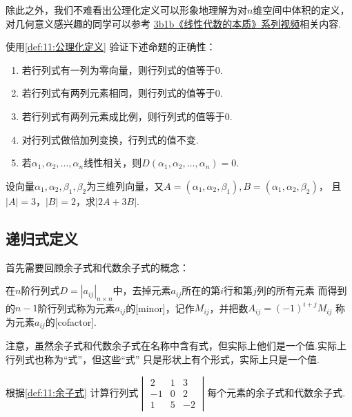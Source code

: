 除此之外，我们不难看出公理化定义可以形象地理解为对$n$维空间中体积的定义，
对几何意义感兴趣的同学可以参考 \href{https://b23.tv/BV1ys411472E}{3b1b《线性代数的本质》系列视频}相关内容.
\begin{example} \label{ex:11:公理化定义}
    使用\autoref{def:11:公理化定义} 验证下述命题的正确性：
    \begin{enumerate}
        \item 若行列式有一列为零向量，则行列式的值等于0.

        \item 若行列式有两列元素相同，则行列式的值等于0.

        \item 若行列式有两列元素成比例，则行列式的值等于0.

        \item 对行列式做倍加列变换，行列式的值不变.

        \item 若$\alpha_1,\alpha_2,\ldots,\alpha_n$线性相关，则$D(\alpha_1,\alpha_2,\ldots,\alpha_n)=0$.
    \end{enumerate}
\end{example}
\begin{solution}

\end{solution}

\begin{example} \label{ex:11:公理化定义2}
    设向量$\alpha_1,\alpha_2,\beta_1,\beta_2$为三维列向量，又$A=(\alpha_1,\alpha_2,\beta_1),B=(\alpha_1,\alpha_2,\beta_2)$，
    且$|A|=3$，$|B|=2$，求$|2A+3B|$.
\end{example}
\begin{solution}

\end{solution}

\subsection{递归式定义}
首先需要回顾余子式和代数余子式的概念：
\begin{definition} \label{def:11:余子式}
    在$n$阶行列式$D=|a_{ij}|_{n \times n}$中，去掉元素$a_{ij}$所在的第$i$行和第$j$列的所有元素
    而得到的$n-1$阶行列式称为元素$a_{ij}$的[minor]，记作$M_{ij}$，并把数$A_{ij}=(-1)^{i+j}M_{ij}$
    称为元素$a_{ij}$的[cofactor].
\end{definition}
注意，虽然余子式和代数余子式在名称中含有式，但实际上他们是一个值.实际上行列式也称为``式''，但这些``式''
只是形状上有个形式，实际上只是一个值.
\begin{example} \label{ex:11:cofactor}
    根据\autoref{def:11:余子式} 计算行列式$\begin{vmatrix}
        2 & 1 & 3 \\
        -1 & 0 & 2 \\
        1 & 5 & -2
    \end{vmatrix}$每个元素的余子式和代数余子式.
\end{example}
\begin{solution}

\end{solution}

